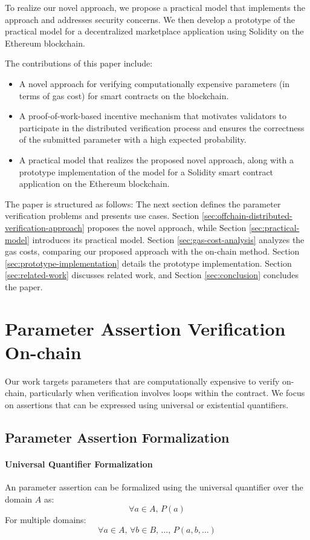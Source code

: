\documentclass[runningheads]{llncs}
\begin{document}
To realize our novel approach, we propose a practical model that implements the approach and addresses security concerns. We then develop a prototype of the practical model for a decentralized marketplace application using Solidity on the Ethereum blockchain.

The contributions of this paper include:
\begin{itemize}
    \item A novel approach for verifying computationally expensive parameters (in terms of gas cost) for smart contracts on the blockchain.
    \item A proof-of-work-based incentive mechanism that motivates validators to participate in the distributed verification process and ensures the correctness of the submitted parameter with a high expected probability.
    \item A practical model that realizes the proposed novel approach, along with a prototype implementation of the model for a Solidity smart contract application on the Ethereum blockchain.
\end{itemize}


The paper is structured as follows: The next section defines the parameter verification problems and presents use cases. Section \ref{sec:offchain-distributed-verification-approach} proposes the novel approach, while Section \ref{sec:practical-model} introduces its practical model. Section \ref{sec:gas-cost-analysis} analyzes the gas costs, comparing our proposed approach with the on-chain method. Section \ref{sec:prototype-implementation} details the prototype implementation. Section \ref{sec:related-work} discusses related work, and Section \ref{sec:conclusion} concludes the paper.
\section{Parameter Assertion Verification On-chain}
\label{sec:parameter-assertion-verification-onchain}
Our work targets parameters that are computationally expensive to verify on-chain, particularly when verification involves loops within the contract. We focus on assertions that can be expressed using universal or existential quantifiers.
\subsection{Parameter Assertion Formalization}
\paragraph{Universal Quantifier Formalization}
An parameter assertion can be formalized using the universal quantifier over the domain \(A\) as:
\begin{equation} \label{eq:1}
    \forall a \in A, \, P(a)
\end{equation}
For multiple domains:
\begin{equation} \label{eq:2}
    \forall a \in A, \, \forall b \in B, \, \dots, \, P(a, b, \dots)
\end{equation}
\end{document}
